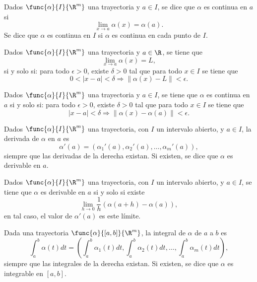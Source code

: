 \documentclass[a4,11pt]{aleph-notas}
\begin{document}
\begin{defi}[Continuidad]
    Dados $\func{\alpha}{I}{\R^m}$ una trayectoria y $a\in I$, se dice que $\alpha$ es continua en $a$ si
    \[
        \lim_{x\to a}\alpha(x)=\alpha(a).
    \]
    Se dice que $\alpha$ es continua en $I$ si $\alpha$ es continua en cada punto de $I$.
\end{defi}

\begin{prop}
    Dados $\func{\alpha}{I}{\R^m}$ una trayectoria y $a\in \R$, se tiene que
    \[
        \lim_{x\to a}\alpha(x)=L,
    \]
    si y solo si: para todo $\epsilon>0$, existe $\delta>0$ tal que para todo $x\in I$ se tiene que
    \[
        0<|x-a|<\delta \Longrightarrow \|\alpha(x)-L\|<\epsilon.
    \]
\end{prop}

\begin{prop}
    Dados $\func{\alpha}{I}{\R^m}$ una trayectoria y $a\in I$, se tiene que $\alpha$ es continua en $a$ si y solo si: para todo $\epsilon>0$, existe $\delta>0$ tal que para todo $x\in I$ se tiene que
    \[
        |x-a|<\delta \Longrightarrow \|\alpha(x)-\alpha(a)\|<\epsilon.
    \]
    \end{prop}
    
    \begin{defi}[Derivada]
    Dados $\func{\alpha}{I}{\R^m}$ una trayectoria, con $I$ un intervalo abierto, y $a\in I$, la derivada de $\alpha$ en $a$ es
    \[
        \alpha'(a)=\left(\alpha_1'(a),\alpha_2'(a),\ldots,\alpha_m'(a)\right),
    \]
    siempre que las derivadas de la derecha existan. Si existen, se dice que $\alpha$ es derivable en $a$.
\end{defi}

\begin{prop}
    Dados $\func{\alpha}{I}{\R^m}$ una trayectoria, con $I$ un intervalo abierto, y $a\in I$, se tiene que $\alpha$ es derivable en $a$ si y solo si existe
    \[
        \lim_{h\to 0} \frac 1 h ( \alpha(a+h)-\alpha(a) ),
    \]
    en tal caso, el valor de $\alpha'(a)$ es este límite.
\end{prop}

\begin{defi}[Integral]
    Dada una trayectoria $\func{\alpha}{[a,b]}{\R^m}$, la integral de $\alpha$ de $a$ a $b$ es
    \[
        \int_a^b \alpha(t)dt=\left(\int_a^b \alpha_1(t)dt,\int_a^b \alpha_2(t)dt,\ldots,\int_a^b \alpha_m(t)dt\right),
    \]
    siempre que las integrales de la derecha existan. Si existen, se dice que $\alpha$ es integrable en $[a,b]$.
\end{defi}
\end{document}
